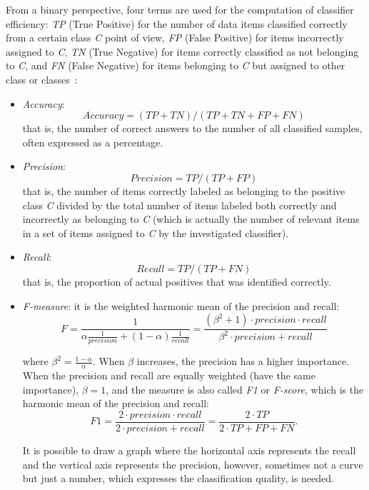 From a binary perspective, four terms are used for the computation of classifier efficiency: 
\textit{TP} (True Positive) for the number of data items classified correctly
from a certain class \textit{C} point of view, 
\textit{FP} (False Positive) for items incorrectly assigned to \textit{C}, 
\textit{TN} (True Negative) for items correctly classified as not belonging to
\textit{C}, and 
\textit{FN} (False Negative) for items belonging to \textit{C} but assigned to other class
or classes~\cite{ref107}:

\begin{itemize}
    \item \textit{Accuracy}: 
$$
\textit{Accuracy} = ({\textit{TP} + \textit{TN}})/({\textit{TP} + \textit{TN} + \textit{FP} + \textit{FN}})
$$
that is, the number of correct answers to the number of all classified samples, often expressed as a percentage.
    \item \textit{Precision}: 
$$
\textit{Precision} = {\textit{TP}}/({\textit{TP} + \textit{FP}})
$$
that is, the number of items correctly labeled as belonging to the positive class \textit{C} divided by the total number of items labeled both correctly and incorrectly as belonging to \textit{C} (which is actually the number of relevant items in a set of items assigned to \textit{C} by the investigated classifier).
    \item \textit{Recall}: 
$$
\textit{Recall} = {\textit{TP}}/({\textit{TP} + \textit{FN}})
$$
that is, the proportion of actual positives that was identified correctly.
    \item \textit{F-measure}: it is the weighted harmonic mean of the precision and recall:
$$
F = \frac{1}{\alpha \frac{1}{\textit{precision}} + (1-\alpha) \frac{1}{\textit{recall}}}
= \frac{(\beta^2 + 1) \cdot \textit{precision} \cdot \textit{recall}}{\beta^2 \cdot \textit{precision} + \textit{recall}}
$$

where 
$
\beta^2 = \frac{1-\alpha}{\alpha}.
$
When $\beta$ increases, the precision has a higher importance. When the precision and recall are equally weighted (have the same importance), $\beta = 1$, and the measure is also called \textit{F1} or \textit{F-score}, 
which is the harmonic mean of the precision and recall:
$$
F1 = \frac{2 \cdot \textit{precision} \cdot \textit{recall}}{ 2 \cdot\textit{precision} + \textit{recall} }
= \frac{2 \cdot \textit{TP}}{2 \cdot \textit{TP} + \textit{FP} + \textit{FN}}.
$$

It is possible to draw a graph where the horizontal axis represents the
recall and the vertical axis represents the precision, however, sometimes
not a curve but just a number, which expresses the classification quality,
is needed.

\end{itemize}


